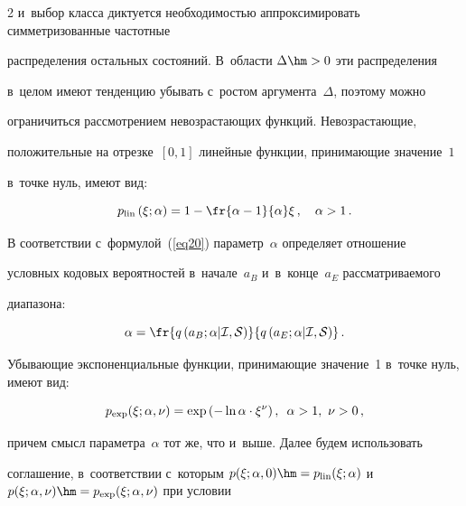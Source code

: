 \begin{multicols}{2}
и~выбор класса диктуется не\-об\-хо\-ди\-мостью аппроксимировать симметризованные час\-тот\-ные 

распределения остальных состояний. В~об\-ласти $\Delta\hm> 0$ эти распределения 

в~целом имеют тенденцию убывать с~ростом аргумента~$\Delta$, поэтому можно 

ограничиться рассмотрением не\-воз\-рас\-та\-ющих функций. Невозрастающие, 

положительные на отрезке~$[0,1]$ линейные функции, принимающие значение~$1$ 

в~точке нуль, имеют вид:

$$

p_{\mathrm{lin}}\left(\xi;\alpha\right) = 1 - 

\fr{\alpha-1}{\alpha}\xi\,, \quad \alpha>1\,.

$$

В соответствии с~формулой~(\ref{eq20}) параметр~$\alpha$ определяет отношение 

условных кодовых вероятностей в~начале~$a_B$  и~в~кон\-це~$a_E$ рассматриваемого 

диапазона:



\noindent

$$

\alpha = \fr{q\left(a_B;\alpha|{\cal I},{\cal S}\right)}{q\left(a_E;\alpha|{\cal I},

{\cal S}\right)}\,.

$$

Убывающие экспоненциальные функции, принимающие значение~1 в~точке нуль, имеют вид:



\noindent

$$

p_{\exp}(\xi;\alpha,\nu) = \exp\left(-\ln\alpha\cdot\xi^\nu\right), 

\enskip \alpha>1,\ \nu>0\,,

$$



\pagebreak



\noindent

причем смысл параметра~$\alpha$ тот же, что и~выше. Далее будем использовать 

соглашение, в~соответствии с~которым $p(\xi;\alpha,0)\hm= p_{\mathrm{lin}}

(\xi;\alpha)$  и~$p(\xi;\alpha,\nu)\hm= p_{\exp}(\xi;\alpha,\nu)$ при условии 


\end{multicols}

